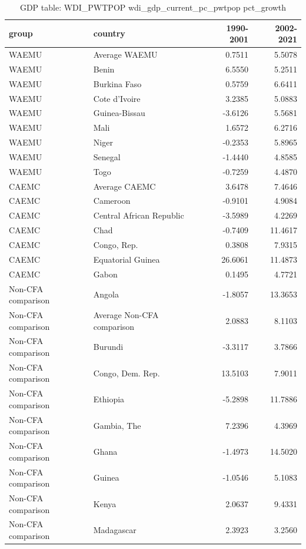 \begin{table}

\caption{GDP table: WDI_PWTPOP wdi_gdp_current_pc_pwtpop pct_growth}
\centering
\begin{tabular}[t]{llrr}
\toprule
group & country & 1990-2001 & 2002-2021\\
\midrule
WAEMU & Average WAEMU & 0.7511 & 5.5078\\
WAEMU & Benin & 6.5550 & 5.2511\\
WAEMU & Burkina Faso & 0.5759 & 6.6411\\
WAEMU & Cote d'Ivoire & 3.2385 & 5.0883\\
WAEMU & Guinea-Bissau & -3.6126 & 5.5681\\
\addlinespace
WAEMU & Mali & 1.6572 & 6.2716\\
WAEMU & Niger & -0.2353 & 5.8965\\
WAEMU & Senegal & -1.4440 & 4.8585\\
WAEMU & Togo & -0.7259 & 4.4870\\
CAEMC & Average CAEMC & 3.6478 & 7.4646\\
\addlinespace
CAEMC & Cameroon & -0.9101 & 4.9084\\
CAEMC & Central African Republic & -3.5989 & 4.2269\\
CAEMC & Chad & -0.7409 & 11.4617\\
CAEMC & Congo, Rep. & 0.3808 & 7.9315\\
CAEMC & Equatorial Guinea & 26.6061 & 11.4873\\
\addlinespace
CAEMC & Gabon & 0.1495 & 4.7721\\
Non-CFA comparison & Angola & -1.8057 & 13.3653\\
Non-CFA comparison & Average Non-CFA comparison & 2.0883 & 8.1103\\
Non-CFA comparison & Burundi & -3.3117 & 3.7866\\
Non-CFA comparison & Congo, Dem. Rep. & 13.5103 & 7.9011\\
\addlinespace
Non-CFA comparison & Ethiopia & -5.2898 & 11.7886\\
Non-CFA comparison & Gambia, The & 7.2396 & 4.3969\\
Non-CFA comparison & Ghana & -1.4973 & 14.5020\\
Non-CFA comparison & Guinea & -1.0546 & 5.1083\\
Non-CFA comparison & Kenya & 2.0637 & 9.4331\\
\addlinespace
Non-CFA comparison & Madagascar & 2.3923 & 3.2560\\

\end{tabular}
\end{table}
